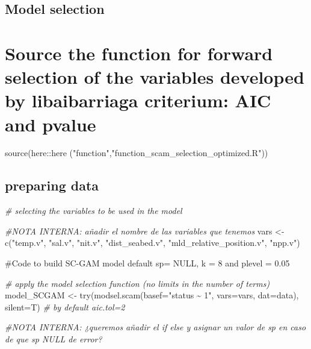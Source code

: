 \documentclass[
]{book}
\newenvironment{Shaded}{\begin{snugshade}}{\end{snugshade}}
\newcommand{\AttributeTok}[1]{\textcolor[rgb]{0.77,0.63,0.00}{#1}}
\newcommand{\CommentTok}[1]{\textcolor[rgb]{0.56,0.35,0.01}{\textit{#1}}}
\newcommand{\FunctionTok}[1]{\textcolor[rgb]{0.00,0.00,0.00}{#1}}
\newcommand{\NormalTok}[1]{#1}
\newcommand{\OtherTok}[1]{\textcolor[rgb]{0.56,0.35,0.01}{#1}}
\newcommand{\SpecialCharTok}[1]{\textcolor[rgb]{0.00,0.00,0.00}{#1}}
\newcommand{\StringTok}[1]{\textcolor[rgb]{0.31,0.60,0.02}{#1}}
\begin{document}
\hypertarget{model-selection}{%
\section{Model selection}\label{model-selection}}

\hypertarget{source-the-function-for-forward-selection-of-the-variables-developed-by-libaibarriaga-criterium-aic-and-pvalue}{%
\chapter{Source the function for forward selection of the variables developed by libaibarriaga criterium: AIC and pvalue}\label{source-the-function-for-forward-selection-of-the-variables-developed-by-libaibarriaga-criterium-aic-and-pvalue}}

\begin{Shaded}
\begin{Highlighting}[]
\FunctionTok{source}\NormalTok{(here}\SpecialCharTok{::}\FunctionTok{here}\NormalTok{ (}\StringTok{"function"}\NormalTok{,}\StringTok{"function\_scam\_selection\_optimized.R"}\NormalTok{))}
\end{Highlighting}
\end{Shaded}

\hypertarget{preparing-data}{%
\section{preparing data}\label{preparing-data}}

\begin{Shaded}
\begin{Highlighting}[]
\CommentTok{\# selecting the variables to be used in the model }

\CommentTok{\#NOTA INTERNA: añadir el nombre de las variables que tenemos}
\NormalTok{vars }\OtherTok{\textless{}{-}} \FunctionTok{c}\NormalTok{(}\StringTok{"temp.v"}\NormalTok{,}
          \StringTok{"sal.v"}\NormalTok{,}
          \StringTok{"nit.v"}\NormalTok{,}
          \StringTok{"dist\_seabed.v"}\NormalTok{,}
          \StringTok{"mld\_relative\_position.v"}\NormalTok{,}
          \StringTok{"npp.v"}\NormalTok{)}
\end{Highlighting}
\end{Shaded}

\#Code to build SC-GAM model default sp= NULL, k = 8 and plevel = 0.05

\begin{Shaded}
\begin{Highlighting}[]
  \CommentTok{\# apply the model selection function (no limits in the number of terms)}
\NormalTok{  model\_SCGAM }\OtherTok{\textless{}{-}} \FunctionTok{try}\NormalTok{(}\FunctionTok{modsel.scam}\NormalTok{(}\AttributeTok{basef=}\StringTok{"status \textasciitilde{} 1"}\NormalTok{, }\AttributeTok{vars=}\NormalTok{vars, }\AttributeTok{dat=}\NormalTok{data), }\AttributeTok{silent=}\NormalTok{T) }\CommentTok{\# by default aic.tol=2}

\CommentTok{\#NOTA INTERNA: ¿queremos añadir el if else y asignar un valor de sp en caso de que sp NULL de error?}
\end{Highlighting}
\end{Shaded}
\end{document}
